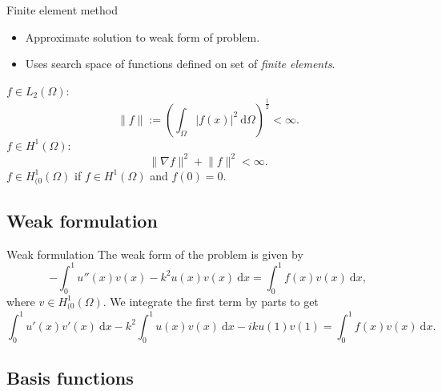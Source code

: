 \documentclass[]{beamer}
\newcommand{\dd}{\mathrm{d}}
\newcommand{\LO}{\ensuremath{L_2(\Omega)}}
\newcommand{\HO}{\ensuremath{H^1(\Omega)}}
\newcommand{\HOzero}{\ensuremath{H^1_{(0}(\Omega)}}
\begin{document}
\begin{frame}{Finite element method}

\begin{itemize}
  \item Approximate solution to weak form of problem.
  \item Uses search space of functions defined on set of \emph{finite elements}.
\end{itemize}

\begin{definition}
  $f \in \LO$:
  \begin{equation*}
  \lVert f \rVert := \left(
    \int_\Omega | f(x) |^2 \ \dd\Omega \right)^{\frac{1}{2}} < \infty.
  \end{equation*}
  $f \in \HO$:
\begin{equation*}
  \lVert \nabla f \rVert^2 + \lVert f \rVert^2 < \infty.
\end{equation*}
  $f \in \HOzero$ if $f \in \HO$ and $f(0) = 0$.
\end{definition}
\end{frame}

\subsection{Weak formulation}

\begin{frame}{Weak formulation}
The weak form of the problem is given by 
\begin{equation*}
  - \int^1_0 u''(x)v(x) - k^2u(x)v(x) \ \dd x = \int^1_0 f(x)v(x) \ \dd x,
\end{equation*}
where $v \in \HOzero$. We integrate the first term by parts to get
\begin{equation*} \label{eq:weakprob}
  \int^1_0 u'(x)v'(x)\ \dd x - k^2 \int^1_0 u(x)v(x) \ \dd x - iku(1)v(1) = \int^1_0 f(x)v(x) \ \dd x.
\end{equation*}
\end{frame}

\subsection{Basis functions}
\end{document}
